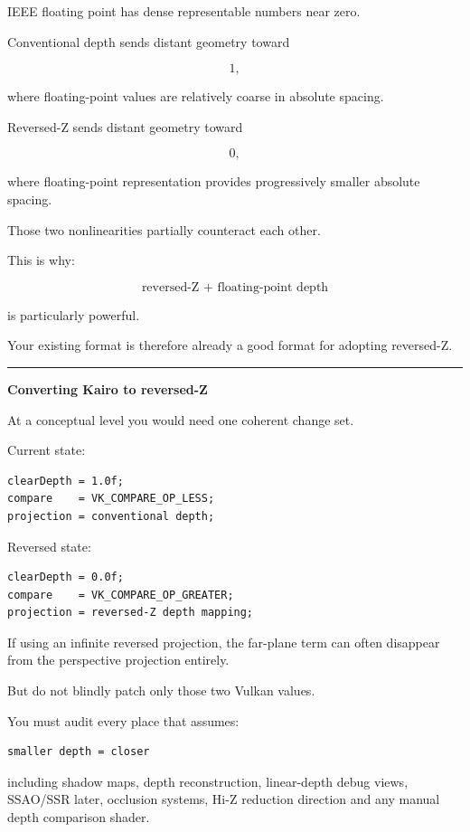 IEEE floating point has dense representable numbers near zero.

Conventional depth sends distant geometry toward

\[
1,
\]

where floating-point values are relatively coarse in absolute spacing.

Reversed-Z sends distant geometry toward

\[
0,
\]

where floating-point representation provides progressively smaller absolute spacing.

Those two nonlinearities partially counteract each other.

This is why:

\[
\boxed{\text{reversed-Z + floating-point depth}}
\]

is particularly powerful.

Your existing  format is therefore already a good format for adopting reversed-Z.

\begin{center}\rule{0.5\linewidth}{0.5pt}\end{center}

\textbf{Converting Kairo to reversed-Z}

At a conceptual level you would need one coherent change set.

Current state:

\begin{verbatim}
clearDepth = 1.0f;
compare    = VK_COMPARE_OP_LESS;
projection = conventional depth;
\end{verbatim}

Reversed state:

\begin{verbatim}
clearDepth = 0.0f;
compare    = VK_COMPARE_OP_GREATER;
projection = reversed-Z depth mapping;
\end{verbatim}

If using an infinite reversed projection, the far-plane term can often disappear from the perspective projection entirely.

But do not blindly patch only those two Vulkan values.

You must audit every place that assumes:

\begin{verbatim}
smaller depth = closer
\end{verbatim}

including shadow maps, depth reconstruction, linear-depth debug views, SSAO/SSR later, occlusion systems, Hi-Z reduction direction and any manual depth comparison shader.

